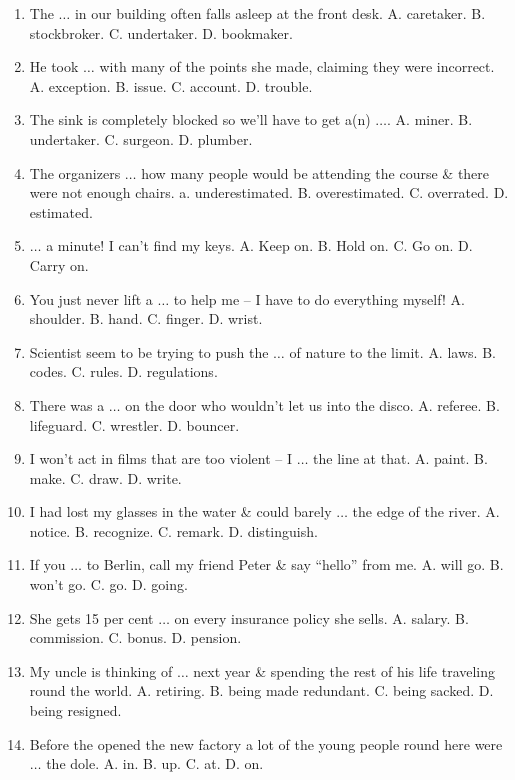 \documentclass{article}
\numberwithin{equation}{section}
\begin{document}
\begin{enumerate}[leftmargin=2mm]
	\item The $\ldots$ in our building often falls asleep at the front desk. {\sf A.} caretaker. {\sf B.} stockbroker. {\sf C.} undertaker. {\sf D.} bookmaker.
	\item He took $\ldots$ with many of the points she made, claiming they were incorrect. {\sf A.} exception. {\sf B.} issue. {\sf C.} account. {\sf D.} trouble.
	\item The sink is completely blocked so we'll have to get a(n) $\ldots$. {\sf A.} miner. {\sf B.} undertaker. {\sf C.} surgeon. {\sf D.} plumber.
	\item The organizers $\ldots$ how many people would be attending the course \& there were not enough chairs. a. underestimated. {\sf B.} overestimated. {\sf C.} overrated. {\sf D.} estimated.
	\item $\ldots$ a minute! I can't find my keys. {\sf A.} Keep on. {\sf B.} Hold on. {\sf C.} Go on. {\sf D.} Carry on.
	\item You just never lift a $\ldots$ to help me -- I have to do everything myself! {\sf A.} shoulder. {\sf B.} hand. {\sf C.} finger. {\sf D.} wrist.
	\item Scientist seem to be trying to push the $\ldots$ of nature to the limit. {\sf A.} laws. {\sf B.} codes. {\sf C.} rules. {\sf D.} regulations.
	\item There was a $\ldots$ on the door who wouldn't let us into the disco. {\sf A.} referee. {\sf B.} lifeguard. {\sf C.} wrestler. {\sf D.} bouncer.
	\item I won't act in films that are too violent -- I $\ldots$ the line at that. {\sf A.} paint. {\sf B.} make. {\sf C.} draw. {\sf D.} write.
	\item I had lost my glasses in the water \& could barely $\ldots$ the edge of the river. {\sf A.} notice. {\sf B.} recognize. {\sf C.} remark. {\sf D.} distinguish.
	\item If you $\ldots$ to Berlin, call my friend Peter \& say ``hello'' from me. {\sf A.} will go. {\sf B.} won't go. {\sf C.} go. {\sf D.} going.
	\item She gets 15 per cent $\ldots$ on every insurance policy she sells. {\sf A.} salary. {\sf B.} commission. {\sf C.} bonus. {\sf D.} pension.
	\item My uncle is thinking of $\ldots$ next year \& spending the rest of his life traveling round the world. {\sf A.} retiring. {\sf B.} being made redundant. {\sf C.} being sacked. {\sf D.} being resigned.
	\item Before the opened the new factory a lot of the young people round here were $\ldots$ the dole. {\sf A.} in. {\sf B.} up. {\sf C.} at. {\sf D.} on.

\end{enumerate}
\end{document}
